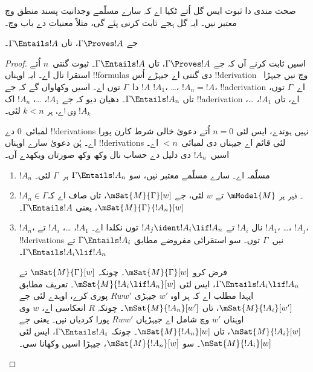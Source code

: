 \documentclass[../../../include/open-logic-section]{subfiles}
\begin{document}


\begin{editorial}
  صحت مندی دا ثبوت ایس گل اُتے ٹکیا اے کہ سارے مسلّمے وجدانیت پسند
  منطق وچ معتبر نیں۔ ایہ گل ہجے ثابت کرنی پئے گی، مثلاً معنیات دے باب وچ۔
\end{editorial}

\begin{thm}
  جے $\Gamma \Proves !A$، تاں $ \Gamma \Entails !A$۔
\end{thm}

\begin{proof}
  اسیں ثابت کرنے آں کہ جے $\Gamma \Proves !A$، تاں $\Gamma \Entails !A$۔
  ثبوت گنتی~$n$ اُتے استقرا نال اے۔ ایہ اوہناں !!{formula}s دی گنتی اے جیہڑے اُس !!{derivation} وچ نیں
  جیہڑا~$!A$ دا~$\Gamma$ توں اے۔
  اسیں وکھاواں گے کہ جے $!A_1$،
  \dots، $!A_n = !A$، !!a{derivation} اے~$\Gamma$ توں، تاں $\Gamma
  \Entails !A_n$۔ دھیان دیو کہ جے $!A_1$، \dots، $!A_n$ اک
  !!a{derivation} اے، تاں $!A_1$، \dots، $!A_k$ وی اے، ہر $k<n$ لئی۔

  لمبائی~$0$ دے !!{derivation}s نہیں ہوندے، ایس لئی $n=0$ اُتے دعویٰ
  خالی شرط کارن پورا اے۔ ہُن دعویٰ سارے اوہناں !!{derivation}s لئی قائم اے
  جیہناں دی لمبائی~$<n$ اے۔ اسیں~$!A_n$ دی دلیل دے حساب نال وکھ وکھ صورتاں
  ویکھدے آں۔

  \begin{enumerate}
  \item $!A_n$ مسلّمہ اے۔ سارے مسلّمے معتبر نیں، سو $\Gamma \Entails
    !A_n$ ہر~$\Gamma$ لئی۔
  \item $!A_n \in \Gamma$۔ فیر ہر $\mModel{M}$ تے $w$ لئی، جے
    $\mSat{M}{\Gamma}[w]$، تاں صاف اے کہ $\mSat{M}{\Gamma}{!A_n}[w]$،
    یعنی $\Gamma \Entails !A$۔
  \item $!A_n$، \MP{} نال $!A_i$ تے $!A_j \ident !A_i \lif
    !A_n$ توں نکلدا اے۔ $!A_1$، \dots، $!A_i$ تے $!A_1$، \dots، $!A_j$،
    !!{derivation}s نیں~$\Gamma$ توں۔ سو استقرائی مفروضے مطابق $\Gamma
    \Entails !A_i$ تے $\Gamma \Entails !A_i \lif !A_n$۔

    فرض کرو $\mSat{M}{\Gamma}[w]$۔ چونکہ $\mSat{M}{\Gamma}[w]$ تے
    $\Gamma \Entails !A_i \lif !A_n$، ایس لئی $\mSat{M}{!A_i \lif
      !A_n}[w]$۔ تعریف مطابق ایہدا مطلب اے کہ ہر اوہ $w'$ جیہڑی
    $Rww'$ پوری کرے، اوہدے لئی جے $\mSat{M}{!A_i}[w']$، تاں $\mSat{M}{!A_n}[w']$۔
    چونکہ $R$ انعکاسی اے، $w$ وی اوہناں $w'$ وچ شامل اے جیہڑیاں $Rww'$ پورا
    کردیاں نیں۔ یعنی جے $\mSat{M}{!A_i}[w]$، تاں $\mSat{M}{!A_n}[w]$۔
    چونکہ $\Gamma \Entails !A_i$، ایس لئی $\mSat{M}{!A_i}[w]$۔ سو
    $\mSat{M}{!A_n}[w]$، جیہڑا اسیں وکھانا سی۔
  \end{enumerate}
\end{proof}
\end{document}
